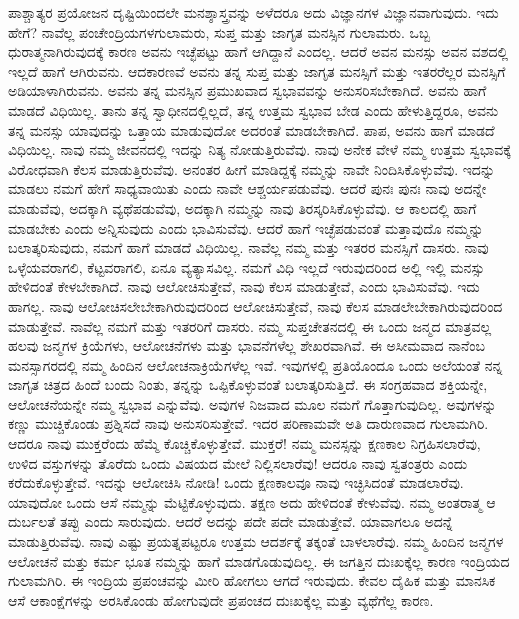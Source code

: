 ಪಾಶ್ಚಾತ್ಯರ ಪ್ರಯೋಜನ ದೃಷ್ಟಿಯಿಂದಲೇ ಮನಶ್ಶಾಸ್ತ್ರವನ್ನು ಅಳೆದರೂ ಅದು ವಿಜ್ಞಾನಗಳ ವಿಜ್ಞಾನವಾಗುವುದು. ಇದು ಹೇಗೆ? ನಾವೆಲ್ಲ ಪಂಚೇಂದ್ರಿಯಗಳ\break ಗುಲಾಮರು, ಸುಪ್ತ ಮತ್ತು ಜಾಗೃತ ಮನಸ್ಸಿನ ಗುಲಾಮರು. ಒಬ್ಬ ಧುರಾತ್ಮನಾಗಿರುವುದಕ್ಕೆ ಕಾರಣ ಅವನು ಇಚ್ಛೆಪಟ್ಟು ಹಾಗೆ ಆಗಿದ್ದಾನೆ ಎಂದಲ್ಲ. ಆದರೆ ಅವನ ಮನಸ್ಸು ಅವನ ವಶದಲ್ಲಿ ಇಲ್ಲದೆ ಹಾಗೆ ಆಗಿರುವನು. ಆದಕಾರಣವೆ ಅವನು ತನ್ನ ಸುಪ್ತ ಮತ್ತು ಜಾಗೃತ ಮನಸ್ಸಿಗೆ ಮತ್ತು ಇತರರೆಲ್ಲರ ಮನಸ್ಸಿಗೆ ಅಡಿಯಾಳಾಗಿರುವನು. ಅವನು ತನ್ನ ಮನಸ್ಸಿನ ಪ್ರಮುಖವಾದ ಸ್ವಭಾವವನ್ನು ಅನುಸರಿಸಬೇಕಾಗಿದೆ. ಅವನು ಹಾಗೆ ಮಾಡದೆ ವಿಧಿಯಿಲ್ಲ. ತಾನು ತನ್ನ ಸ್ವಾಧೀನದಲ್ಲಿಲ್ಲದೆ, ತನ್ನ ಉತ್ತಮ ಸ್ವಭಾವ ಬೇಡ ಎಂದು ಹೇಳುತ್ತಿದ್ದರೂ, ಅವನು ತನ್ನ ಮನಸ್ಸು ಯಾವುದನ್ನು ಒತ್ತಾಯ ಮಾಡುವುದೋ ಅದರಂತೆ ಮಾಡಬೇಕಾಗಿದೆ. ಪಾಪ, ಅವನು ಹಾಗೆ ಮಾಡದೆ ವಿಧಿಯಿಲ್ಲ. ನಾವು ನಮ್ಮ ಜೀವನದಲ್ಲಿ ಇದನ್ನು ನಿತ್ಯ ನೋಡುತ್ತಿರುವೆವು. ನಾವು ಅನೇಕ ವೇಳೆ ನಮ್ಮ ಉತ್ತಮ ಸ್ವಭಾವಕ್ಕೆ ವಿರೋಧವಾಗಿ ಕೆಲಸ ಮಾಡುತ್ತಿರುವೆವು. ಅನಂತರ ಹೀಗೆ ಮಾಡಿದ್ದಕ್ಕೆ ನಮ್ಮನ್ನು ನಾವೇ ನಿಂದಿಸಿಕೊಳ್ಳುವೆವು. ಇದನ್ನು ಮಾಡಲು ನಮಗೆ ಹೇಗೆ ಸಾಧ್ಯವಾಯಿತು ಎಂದು ನಾವೇ ಆಶ್ಚರ್ಯಪಡುವೆವು. ಆದರೆ ಪುನಃ ಪುನಃ ನಾವು ಅದನ್ನೇ ಮಾಡುವೆವು, ಅದಕ್ಕಾಗಿ ವ್ಯಥೆಪಡುವೆವು, ಅದಕ್ಕಾಗಿ ನಮ್ಮನ್ನು ನಾವು ತಿರಸ್ಕರಿಸಿಕೊಳ್ಳುವೆವು. ಆ ಕಾಲದಲ್ಲಿ ಹಾಗೆ ಮಾಡಬೇಕು ಎಂದು ಅನ್ನಿಸುವುದು ಎಂದು ಭಾವಿಸುವೆವು. ಆದರೆ ಹಾಗೆ ಇಚ್ಛೆಪಡುವಂತೆ ಮತ್ತಾವುದೊ ನಮ್ಮನ್ನು ಬಲಾತ್ಕರಿಸುವುದು, ನಮಗೆ ಹಾಗೆ ಮಾಡದೆ ವಿಧಿಯಿಲ್ಲ. ನಾವೆಲ್ಲ ನಮ್ಮ ಮತ್ತು ಇತರರ ಮನಸ್ಸಿಗೆ ದಾಸರು. ನಾವು ಒಳ್ಳೆಯವರಾಗಲಿ, ಕೆಟ್ಟವರಾಗಲಿ, ಏನೂ ವ್ಯತ್ಯಾಸವಿಲ್ಲ. ನಮಗೆ ವಿಧಿ ಇಲ್ಲದೆ ಇರುವುದರಿಂದ ಅಲ್ಲಿ ಇಲ್ಲಿ ಮನಸ್ಸು ಹೇಳಿದಂತೆ ಕೇಳಬೇಕಾಗಿದೆ. ನಾವು ಆಲೋಚಿಸುತ್ತೇವೆ, ನಾವು ಕೆಲಸ ಮಾಡುತ್ತೇವೆ, ಎಂದು ಭಾವಿಸುವೆವು. ಇದು ಹಾಗಲ್ಲ. ನಾವು ಆಲೋಚಿಸಲೇಬೇಕಾಗಿರುವುದರಿಂದ ಆಲೋಚಿಸುತ್ತೇವೆ, ನಾವು ಕೆಲಸ ಮಾಡಲೇಬೇಕಾಗಿರುವುದರಿಂದ ಮಾಡುತ್ತೇವೆ. ನಾವೆಲ್ಲ ನಮಗೆ ಮತ್ತು ಇತರರಿಗೆ ದಾಸರು. ನಮ್ಮ ಸುಪ್ತಚೇತನದಲ್ಲಿ ಈ ಒಂದು ಜನ್ಮದ ಮಾತ್ರವಲ್ಲ ಹಲವು ಜನ್ಮಗಳ ಕ್ರಿಯೆಗಳು, ಆಲೋಚನೆಗಳು ಮತ್ತು ಭಾವನೆಗಳೆಲ್ಲ ಶೇಖರವಾಗಿವೆ. ಈ ಅಸೀಮವಾದ ನಾನೆಂಬ ಮನಸ್ಸಾಗರದಲ್ಲಿ ನಮ್ಮ ಹಿಂದಿನ ಆಲೋಚನಾಕ್ರಿಯೆಗಳೆಲ್ಲ ಇವೆ. ಇವುಗಳಲ್ಲಿ ಪ್ರತಿಯೊಂದೂ ಒಂದು ಅಲೆಯಂತೆ ನನ್ನ ಜಾಗೃತ ಚಿತ್ರದ ಹಿಂದೆ ಬಂದು ನಿಂತು, ತನ್ನನ್ನು ಒಪ್ಪಿಕೊಳ್ಳುವಂತೆ ಬಲಾತ್ಕರಿಸುತ್ತಿದೆ. ಈ ಸಂಗ್ರಹವಾದ ಶಕ್ತಿಯನ್ನೇ, ಆಲೋಚನೆಯನ್ನೇ ನಮ್ಮ ಸ್ವಭಾವ ಎನ್ನುವೆವು. ಅವುಗಳ ನಿಜವಾದ ಮೂಲ ನಮಗೆ ಗೊತ್ತಾಗುವುದಿಲ್ಲ. ಅವುಗಳನ್ನು ಕಣ್ಣು ಮುಚ್ಚಿಕೊಂಡು ಪ್ರಶ್ನಿಸದೆ ನಾವು ಅನುಸರಿಸುತ್ತೇವೆ. ಇದರ ಪರಿಣಾಮವೇ ಅತಿ ದಾರುಣವಾದ ಗುಲಾಮಗಿರಿ. ಆದರೂ ನಾವು ಮುಕ್ತರೆಂದು ಹೆಮ್ಮೆ ಕೊಚ್ಚಿಕೊಳ್ಳುತ್ತೇವೆ. ಮುಕ್ತರೆ! ನಮ್ಮ ಮನಸ್ಸನ್ನು ಕ್ಷಣಕಾಲ ನಿಗ್ರಹಿಸಲಾರೆವು, ಉಳಿದ ವಸ್ತುಗಳನ್ನು ತೊರೆದು ಒಂದು ವಿಷಯದ ಮೇಲೆ ನಿಲ್ಲಿಸಲಾರೆವು! ಆದರೂ ನಾವು ಸ್ವತಂತ್ರರು ಎಂದು ಕರೆದುಕೊಳ್ಳುತ್ತೇವೆ. ಇದನ್ನು ಆಲೋಚಿಸಿ ನೋಡಿ! ಒಂದು ಕ್ಷಣಕಾಲವೂ ನಾವು ಇಚ್ಛಿಸಿದಂತೆ ಮಾಡಲಾರೆವು. ಯಾವುದೋ ಒಂದು ಆಸೆ ನಮ್ಮನ್ನು ಮೆಟ್ಟಿಕೊಳ್ಳುವುದು. ತಕ್ಷಣ ಅದು ಹೇಳಿದಂತೆ ಕೇಳುವೆವು. ನಮ್ಮ ಅಂತರಾತ್ಮ ಆ ದುರ್ಬಲತೆ ತಪ್ಪು ಎಂದು ಸಾರುವುದು. ಆದರೆ ಅದನ್ನು ಪದೇ ಪದೇ ಮಾಡುತ್ತೇವೆ. ಯಾವಾಗಲೂ ಅದನ್ನೆ ಮಾಡುತ್ತಿರುವೆವು. ನಾವು ಎಷ್ಟು ಪ್ರಯತ್ನಪಟ್ಟರೂ ಉತ್ತಮ ಆದರ್ಶಕ್ಕೆ ತಕ್ಕಂತೆ ಬಾಳಲಾರೆವು. ನಮ್ಮ ಹಿಂದಿನ ಜನ್ಮಗಳ ಆಲೋಚನೆ ಮತ್ತು ಕರ್ಮ ಭೂತ ನಮ್ಮನ್ನು ಹಾಗೆ ಮಾಡಗೊಡುವುದಿಲ್ಲ. ಈ ಜಗತ್ತಿನ ದುಃಖಕ್ಕೆಲ್ಲ ಕಾರಣ ಇಂದ್ರಿಯದ ಗುಲಾಮಗಿರಿ. ಈ ಇಂದ್ರಿಯ ಪ್ರಪಂಚವನ್ನು ಮೀರಿ ಹೋಗಲು ಆಗದೆ ಇರುವುದು. ಕೇವಲ ದೈಹಿಕ ಮತ್ತು ಮಾನಸಿಕ ಆಸೆ ಆಕಾಂಕ್ಷೆಗಳನ್ನು ಅರಸಿಕೊಂಡು ಹೋಗುವುದೇ ಪ್ರಪಂಚದ ದುಃಖಕ್ಕೆಲ್ಲ ಮತ್ತು ವ್ಯಥೆಗೆಲ್ಲ ಕಾರಣ.

